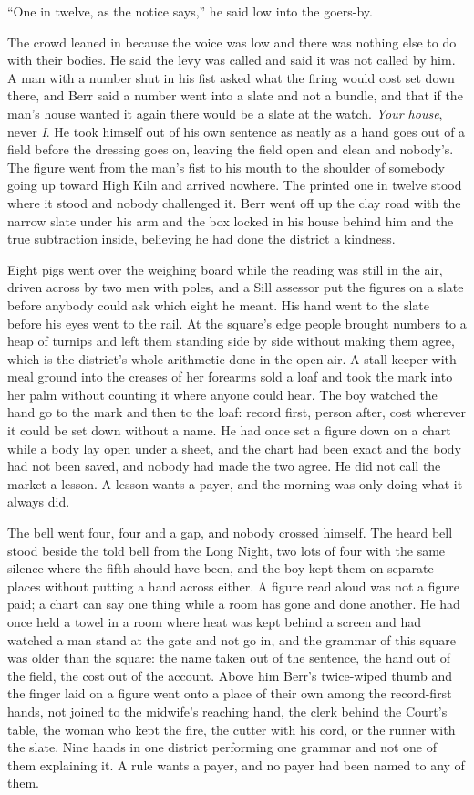 “One in twelve, as the notice says,” he said low into the goers-by.

The crowd leaned in because the voice was low and there was nothing else to do with their bodies. He said the levy was called and said it was not called by him. A man with a number shut in his fist asked what the firing would cost set down there, and Berr said a number went into a slate and not a bundle, and that if the man's house wanted it again there would be a slate at the watch. \emph{Your house}, never \emph{I}. He took himself out of his own sentence as neatly as a hand goes out of a field before the dressing goes on, leaving the field open and clean and nobody's. The figure went from the man's fist to his mouth to the shoulder of somebody going up toward High Kiln and arrived nowhere. The printed one in twelve stood where it stood and nobody challenged it. Berr went off up the clay road with the narrow slate under his arm and the box locked in his house behind him and the true subtraction inside, believing he had done the district a kindness.

Eight pigs went over the weighing board while the reading was still in the air, driven across by two men with poles, and a Sill assessor put the figures on a slate before anybody could ask which eight he meant. His hand went to the slate before his eyes went to the rail. At the square's edge people brought numbers to a heap of turnips and left them standing side by side without making them agree, which is the district's whole arithmetic done in the open air. A stall-keeper with meal ground into the creases of her forearms sold a loaf and took the mark into her palm without counting it where anyone could hear. The boy watched the hand go to the mark and then to the loaf: record first, person after, cost wherever it could be set down without a name. He had once set a figure down on a chart while a body lay open under a sheet, and the chart had been exact and the body had not been saved, and nobody had made the two agree. He did not call the market a lesson. A lesson wants a payer, and the morning was only doing what it always did.

The bell went four, four and a gap, and nobody crossed himself. The heard bell stood beside the told bell from the Long Night, two lots of four with the same silence where the fifth should have been, and the boy kept them on separate places without putting a hand across either. A figure read aloud was not a figure paid; a chart can say one thing while a room has gone and done another. He had once held a towel in a room where heat was kept behind a screen and had watched a man stand at the gate and not go in, and the grammar of this square was older than the square: the name taken out of the sentence, the hand out of the field, the cost out of the account. Above him Berr's twice-wiped thumb and the finger laid on a figure went onto a place of their own among the record-first hands, not joined to the midwife's reaching hand, the clerk behind the Court's table, the woman who kept the fire, the cutter with his cord, or the runner with the slate. Nine hands in one district performing one grammar and not one of them explaining it. A rule wants a payer, and no payer had been named to any of them.

